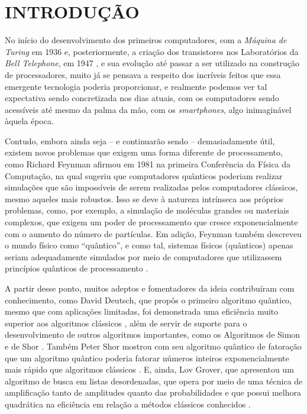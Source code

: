\chapter{INTRODUÇ\~{A}O}
\label{chap: introducao}

No início do desenvolvimento dos primeiros computadores, com a \emph{M\'{a}quina de Turing} em 1936 e, posteriormente, a criaç\~{a}o dos transistores nos Laboratórios da \emph{Bell Telephone}, em 1947 \cite{transistor_hist}, e sua evoluç\~{a}o at\'{e} passar a ser utilizado na construç\~{a}o de processadores, muito j\'{a} se pensava a respeito dos incríveis feitos que essa emergente tecnologia poderia proporcionar, e realmente podemos ver tal expectativa sendo concretizada nos dias atuais, com os computadores sendo acessíveis at\'{e} mesmo da palma da m\~{a}o, com os \textit{smartphones}, algo inimagin\'{a}vel àquela \'{e}poca.

Contudo, embora ainda seja – e continuar\~{a}o sendo – demasiadamente útil, existem novos problemas que exigem uma forma diferente de processamento, como Richard Feynman afirmou em 1981 na primeira Confer\^{e}ncia da Física da Computaç\~{a}o, na qual sugeriu que computadores qu\^{a}nticos poderiam realizar simulações que s\~{a}o impossíveis de serem realizadas pelos computadores cl\'{a}ssicos, mesmo aqueles mais robustos. Isso se deve à natureza intrínseca aos próprios problemas, como, por exemplo, a simulaç\~{a}o de mol\'{e}culas grandes ou materiais complexos, que exigem um poder de processamento que cresce exponencialmente com o aumento do número de partículas. Em adiç\~{a}o, Feynman tamb\'{e}m descreveu o mundo físico como “qu\^{a}ntico”, e como tal, sistemas físicos (qu\^{a}nticos) apenas seriam adequadamente simulados por meio de computadores que utilizassem princípios qu\^{a}nticos de processamento \cite{feynman1982}.

A partir desse ponto, muitos adeptos e fomentadores da ideia contribuíram com conhecimento, como David Deutsch, que propôs o primeiro algoritmo qu\^{a}ntico, mesmo que com aplicações limitadas, foi demonstrada uma efici\^{e}ncia muito superior aos algoritmos cl\'{a}ssicos \cite{deutsch1985}, al\'{e}m de servir de suporte para o desenvolvimento de outros algoritmos importantes, como os Algoritmos de Simon \cite{simon1994} e de Shor . Tamb\'{e}m Peter Shor mostrou com seu algoritmo qu\^{a}ntico de fatoraç\~{a}o que um algoritmo qu\^{a}ntico poderia fatorar números inteiros exponencialmente mais r\'{a}pido que algoritmos cl\'{a}ssicos \cite{shor1994}. E, ainda, Lov Grover, que apresentou um algoritmo de busca em listas desordenadas, que opera por meio de uma t\'{e}cnica de amplificaç\~{a}o tanto de amplitudes quanto das probabilidades e que possui melhora quadr\'{a}tica na efici\^{e}ncia em relaç\~{a}o a m\'{e}todos cl\'{a}ssicos conhecidos \cite{grover1996}. 

